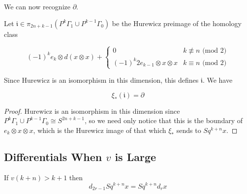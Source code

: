 We can now recognize $\partial$.
\begin{Lemma}
  \label{sec:ilem}
  Let $\mathfrak{i}\in \pi_{2n+k-1}(P^k\Gamma_1\cup P^{k-1}\Gamma_0)$ be the Hurewicz preimage of the homology class

  \[(-1)^ke_k\otimes d(x\otimes x) + \left\{\begin{array}{cc} 
  0 & k\not\equiv n\mbox{ (mod 2)}\\
  (-1)^k2e_{k-1}\otimes x\otimes x & k\equiv n\mbox{ (mod 2)}\end{array}\right.\]

  Since Hurewicz is an isomorphism in this dimension, this defines $\mathfrak{i}$.  We have

  \[\xi_*(\mathfrak{i}) = \partial\]
\end{Lemma}

\begin{proof}
  Hurewicz is an isomorphism in this dimension since $P^k\Gamma_1\cup P^{k-1}\Gamma_0\cong S^{2n+k-1}$, so we need only notice that this is the boundary of $e_k\otimes x\otimes x$, which is the Hurewicz image of that which $\xi_*$ sends to $Sq^{k+n}x$.  
\end{proof}


\subsection{Differentials When $v$ is Large}

\begin{Theorem}
  If $v(k+n)>k+1$ then 
  \[d_{2r-1}Sq^{k+n}x=Sq^{k+n}d_r x\]
\end{Theorem}

